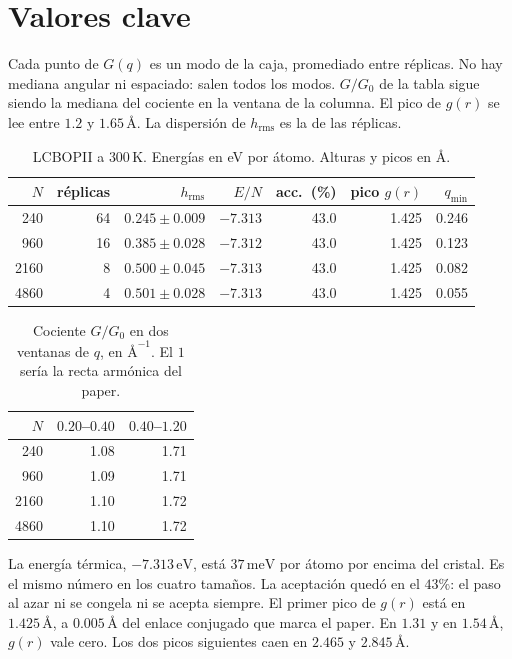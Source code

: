 \documentclass[11pt,a4paper]{article}
\begin{document}
\section{Valores clave}

Cada punto de $G(q)$ es un modo de la caja, promediado entre réplicas.
No hay mediana angular ni espaciado: salen todos los modos.
$G/G_0$ de la tabla sigue siendo la mediana del cociente en la ventana de la columna.
El pico de $g(r)$ se lee entre $1.2$ y $1.65\,\text{\AA}$.
La dispersión de $h_{\mathrm{rms}}$ es la de las réplicas.

\begin{table}[ht]
\centering
\small
\caption{LCBOPII a $300\,\mathrm{K}$. Energías en eV por átomo. Alturas y picos en \AA.}
\begin{tabular}{rrrrrrr}
\toprule
$N$ & réplicas & $h_{\mathrm{rms}}$ & $E/N$ & acc.\ (\%) & pico $g(r)$ & $q_{\min}$ \\
\midrule
240  & 64 & $0.245\pm 0.009$ & $-7.313$ & 43.0 & 1.425 & 0.246 \\
960  & 16 & $0.385\pm 0.028$ & $-7.312$ & 43.0 & 1.425 & 0.123 \\
2160 &  8 & $0.500\pm 0.045$ & $-7.313$ & 43.0 & 1.425 & 0.082 \\
4860 &  4 & $0.501\pm 0.028$ & $-7.313$ & 43.0 & 1.425 & 0.055 \\
\bottomrule
\end{tabular}
\end{table}

\begin{table}[ht]
\centering
\small
\caption{Cociente $G/G_0$ en dos ventanas de $q$, en $\text{\AA}^{-1}$.
El $1$ sería la recta armónica del paper.}
\begin{tabular}{rrr}
\toprule
$N$ & $0.20$--$0.40$ & $0.40$--$1.20$ \\
\midrule
240  & 1.08 & 1.71 \\
960  & 1.09 & 1.71 \\
2160 & 1.10 & 1.72 \\
4860 & 1.10 & 1.72 \\
\bottomrule
\end{tabular}
\end{table}

La energía térmica, $-7.313\,\mathrm{eV}$, está $37\,\mathrm{meV}$ por átomo por encima del cristal.
Es el mismo número en los cuatro tamaños.
La aceptación quedó en el $43\%$: el paso al azar ni se congela ni se acepta siempre.
El primer pico de $g(r)$ está en $1.425\,\text{\AA}$, a $0.005\,\text{\AA}$ del enlace conjugado que marca el paper.
En $1.31$ y en $1.54\,\text{\AA}$, $g(r)$ vale cero.
Los dos picos siguientes caen en $2.465$ y $2.845\,\text{\AA}$.
\end{document}
